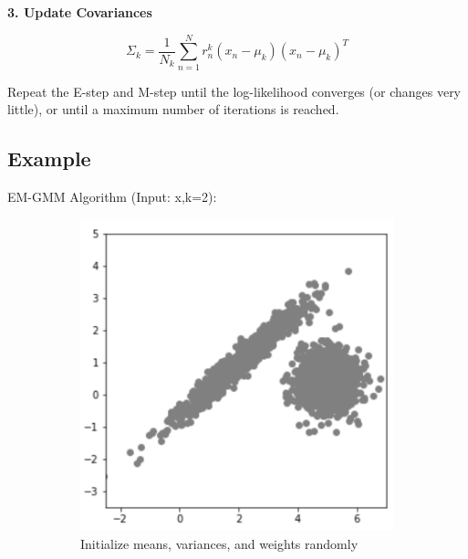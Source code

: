 \documentclass[11pt]{article}
\begin{document}
\textbf{3. Update Covariances}

\[
	\Sigma_k = \frac{1}{N_k} \sum_{n=1}^{N} r_n^k (x_n - \mu_k)(x_n - \mu_k)^T
\]

Repeat the E-step and M-step until the log-likelihood converges (or changes very little), or until a maximum number of iterations is reached.

\pagebreak

\subsection*{Example}
EM-GMM Algorithm (Input: x,k=2):

\begin{figure}[!ht]
	\centering

	\begin{subfigure}[t]{0.3\textwidth}
		\centering
		\includegraphics[width=\textwidth]{../imgs/gmm_p1.png}
		\caption*{\small Initialize means, variances, and weights randomly}
	\end{subfigure}
	\hspace{0.15\textwidth}
	\begin{subfigure}[t]{0.3\textwidth}
		\centering

\end{subfigure}
\end{figure}
\end{document}
